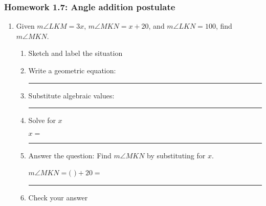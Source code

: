 \documentclass[12pt, oneside]{article}
\begin{document}
\newpage
\subsubsection*{Homework 1.7: Angle addition postulate}
  \begin{enumerate}
      \item Given $m\angle LKM = 3x$, $m\angle MKN = x+20$, and $m\angle LKN = 100$, find $m\angle MKN$.  \vspace{1cm}
      \begin{enumerate}
        \item Sketch and label the situation
        \begin{flushright}
        \end{flushright}
        \vspace{1cm}

        \item Write a geometric equation: \rule{5cm}{0.15mm} \vspace{1cm}
        \item Substitute algebraic values: \rule{5cm}{0.15mm}
        \item Solve for $x$
        \vspace{3cm}
        \begin{center} $x=$ \rule{1cm}{0.15mm} \end{center}
        \item Answer the question: Find $m\angle MKN$ by substituting for $x$.\\
        \begin{center} $m\angle MKN=($ \hspace{1cm} $)+20=$ \rule{1cm}{0.15mm} \end{center}
        \item Check your answer
      \end{enumerate}
      \vspace{2cm}

\newpage


\end{enumerate}
\end{document}
